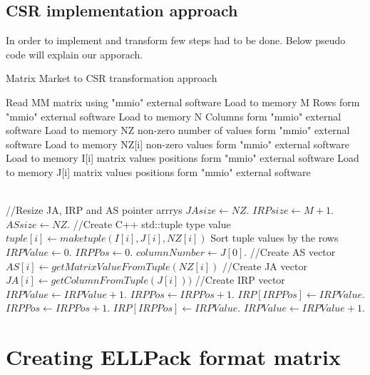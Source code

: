 \documentclass{scrreprt}
\begin{document}
\subsection{CSR implementation approach}

In order to implement and transform few steps had to be done. Below pseudo code will explain our apporach.

\begin{algorithm}
\caption{Matrix Market to CSR transformation approach}\label{euclid}
\begin{algorithmic}[1]
\State Read MM matrix using "mmio" external software
\State Load to memory M Rows form "mmio" external software
\State Load to memory N Columns form "mmio" external software
\State Load to memory NZ non-zero number of values form "mmio" external software
        \State Load to memory NZ[i] non-zero values form "mmio" external software
		\State Load to memory I[i] matrix values positions form "mmio" external software
		\State Load to memory J[i] matrix values positions  form "mmio" external software
      \EndFor

\\
\State //Resize JA, IRP and AS pointer arrrys
\State $JAsize \gets NZ$.
\State $IRPsize \gets M+1$.
\State $ASsize \gets NZ$.
\State //Create C++ std::tuple type value
        \State $tuple[i] \gets maketuple(I[i], J[i], NZ[i])$
      \EndFor
\State
\State Sort tuple values by the rows
\State
\State $IRPValue \gets 0$.
\State $IRPPos \gets 0$.
\State $columnNumber \gets J[0]$.
		\State //Create AS vector
        \State $AS[i] \gets getMatrixValueFromTuple(NZ[i])$
        \State //Create JA vector
         \State $JA[i] \gets getColumnFromTuple(J[i]))$
         \State //Create IRP vector
		\State $IRPValue \gets IRPValue+1$.
		 \Else
		 \State $IRPPos \gets IRPPos+1$.
		 \State $IRP[IRPPos] \gets IRPValue$.
		\State $IRPPos \gets IRPPos+1$.
		 \State $IRP[IRPPos] \gets IRPValue$.
		 \EndWhile
		 \State $IRPValue \gets IRPValue+1$.

		\EndIf
      
      \EndFor

\EndProcedure
\end{algorithmic}
\end{algorithm}
\FloatBarrier


\section{Creating ELLPack format matrix}
\end{document}
